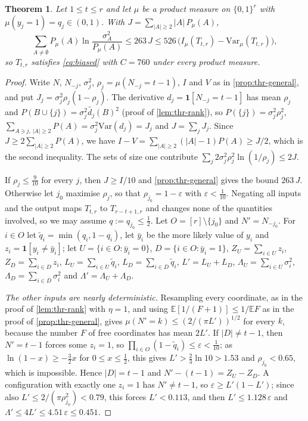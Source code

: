 \documentclass[11pt]{amsart}
\newtheorem{theorem}{Theorem}[section]
\theoremstyle{definition}
\theoremstyle{remark}
\newcommand{\E}{\mathbb{E}}
\newcommand{\Var}{\mathrm{Var}}
\newcommand{\bits}{\{0,1\}}
\begin{document}
\begin{theorem}\label{thm:thr-strong}
Let $1\le t\le r$ and let $\mu$ be a product measure on $\bits^r$ with $\mu(y_j=1)=q_j\in(0,1)$. With
$J=\sum_{|A|\ge2}|A|\,P_\mu(A)$,
\[
\sum_{A\ne\emptyset}P_\mu(A)\ln\frac{\sigma_A^2}{P_\mu(A)}\le263\,J\le526\,\bigl(I_\mu(T_{t,r})-\Var_\mu(T_{t,r})\bigr),
\]
so $T_{t,r}$ satisfies \eqref{eq:biased} with $C=760$ under every product measure.
\end{theorem}

\begin{proof}
Write $N$, $N_{-j}$, $\sigma_j^2$, $\rho_j=\mu(N_{-j}=t-1)$, $I$ and $V$ as in \cref{prop:thr-general}, and put
$J_j=\sigma_j^2\rho_j(1-\rho_j)$. The derivative $d_j=\mathbf 1[N_{-j}=t-1]$ has mean $\rho_j$ and
$P(B\cup\{j\})=\sigma_j^2\widetilde{d_j}(B)^2$ (proof of \cref{lem:thr-rank}), so $P(\{j\})=\sigma_j^2\rho_j^2$,
$\sum_{A\ni j,\,|A|\ge2}P(A)=\sigma_j^2\Var(d_j)=J_j$ and $J=\sum_jJ_j$. Since $J\ge2\sum_{|A|\ge2}P(A)$, we have
$I-V=\sum_{|A|\ge2}(|A|-1)P(A)\ge J/2$, which is the second inequality. The sets of size one contribute
$\sum_j2\sigma_j^2\rho_j^2\ln(1/\rho_j)\le2J$.

If $\rho_j\le\frac9{10}$ for every $j$, then $J\ge I/10$ and \cref{prop:thr-general} gives the bound $263\,J$.
Otherwise let $j_0$ maximise $\rho_j$, so that $\rho_{j_0}=1-\varepsilon$ with $\varepsilon<\frac1{10}$. Negating all
inputs and the output maps $T_{t,r}$ to $T_{r-t+1,r}$ and changes none of the quantities involved, so we may assume
$q:=q_{j_0}\le\frac12$. Let $O=[r]\setminus\{j_0\}$ and $N'=N_{-j_0}$. For $i\in O$ let $\tilde q_i=\min(q_i,1-q_i)$,
let $\bar y_i$ be the more likely value of $y_i$ and $z_i=\mathbf 1[y_i\ne\bar y_i]$; let
$U=\{i\in O:\bar y_i=0\}$, $D=\{i\in O:\bar y_i=1\}$, $Z_U=\sum_{i\in U}z_i$, $Z_D=\sum_{i\in D}z_i$,
$L_U=\sum_{i\in U}\tilde q_i$, $L_D=\sum_{i\in D}\tilde q_i$, $L'=L_U+L_D$, $\Lambda_U=\sum_{i\in U}\sigma_i^2$,
$\Lambda_D=\sum_{i\in D}\sigma_i^2$ and $\Lambda'=\Lambda_U+\Lambda_D$.

\emph{The other inputs are nearly deterministic.} Resampling every coordinate, as in the proof of
\cref{lem:thr-rank} with $\eta=1$, and using $\E[1/(F+1)]\le1/\E F$ as in the proof of \cref{prop:thr-general}, gives
$\mu(N'=k)\le(2/(\pi L'))^{1/2}$ for every $k$, because the number $F$ of free coordinates has mean $2L'$. If $|D|\ne t-1$, then $N'=t-1$ forces some $z_i=1$, so
$\prod_{i\in O}(1-\tilde q_i)\le\varepsilon<\frac1{10}$; as $\ln(1-x)\ge-\frac32x$ for $0\le x\le\frac12$, this gives
$L'>\frac23\ln10>1.53$ and $\rho_{j_0}<0.65$, which is impossible. Hence $|D|=t-1$ and $N'-(t-1)=Z_U-Z_D$. A
configuration with exactly one $z_i=1$ has $N'\ne t-1$, so $\varepsilon\ge L'(1-L')$; since also
$L'\le2/(\pi\rho_{j_0}^2)<0.79$, this forces $L'<0.113$, and then $L'\le1.128\,\varepsilon$ and
$\Lambda'\le4L'\le4.51\,\varepsilon\le0.451$.


\end{proof}
\end{document}

